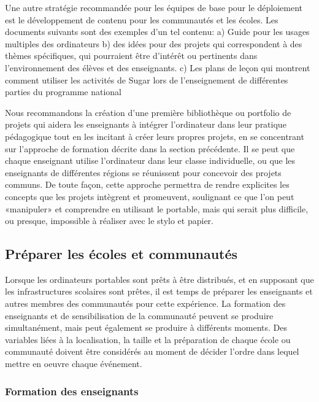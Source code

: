 \documentclass[11pt]{article}
\begin{document}
Une autre stratégie recommandée pour les équipes de base pour le
déploiement est le développement de contenu pour les communautés et les
écoles. Les documents suivants sont des exemples d'un tel contenu: a) Guide
pour les usages multiples des ordinateurs b) des idées pour des projets qui
correspondent à des thèmes spécifiques, qui pourraient être d'intérêt ou
pertinents dans l'environnement des élèves et des enseignants. c) Les plans
de leçon qui montrent comment utiliser les activités de Sugar lors de
l'enseignement de différentes parties du programme national

Nous recommandons la création d'une première bibliothèque ou portfolio de
projets qui aidera les enseignants à intégrer l'ordinateur dans leur
pratique pédagogique tout en les incitant à créer leurs propres projets, en
se concentrant sur l'approche de formation décrite dans la section
précédente. Il se peut que chaque enseignant utilise l'ordinateur dans leur
classe individuelle, ou que les enseignants de différentes régions se
réunissent pour concevoir des projets communs. De toute façon, cette
approche permettra de rendre explicites les concepts que les projets
intègrent et promeuvent, soulignant ce que l'on peut «manipuler» et
comprendre en utilisant le portable, mais qui serait plus difficile, ou
presque, impossible à réaliser avec le stylo et papier.
\subsection{Préparer les écoles et communautés}
\label{sec-9-3}



Lorsque les ordinateurs portables sont prêts à être distribués, et en
supposant que les infrastructures scolaires sont prêtes, il est temps de
préparer les enseignants et autres membres des communautés pour cette
expérience. La formation des enseignants et de sensibilisation de la
communauté peuvent se produire simultanément, mais peut également se
produire à différents moments. Des variables liées à la localisation, la
taille et la préparation de chaque école ou communauté doivent être
considérés au moment de décider l'ordre dans lequel mettre en oeuvre chaque
événement.
\subsubsection{Formation des enseignants}
\label{sec-9-3-1}


\end{document}
